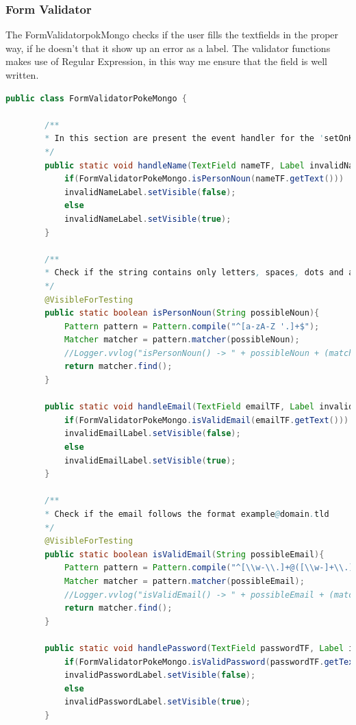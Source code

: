 \subsubsection{Form Validator}
The FormValidatorpokMongo checks if the user fills the textfields in the proper way, if he doesn’t that it show up an error as a label. The validator functions makes use of Regular Expression, in this way me ensure that the field is well written.
\begin{lstlisting}[language=Java]
	public class FormValidatorPokeMongo {
		
		/**
		* In this section are present the event handler for the 'setOnKeyReleased' event in the form.
		*/
		public static void handleName(TextField nameTF, Label invalidNameLabel){
			if(FormValidatorPokeMongo.isPersonNoun(nameTF.getText()))
			invalidNameLabel.setVisible(false);
			else
			invalidNameLabel.setVisible(true);
		}
		
		/**
		* Check if the string contains only letters, spaces, dots and apostrophes.
		*/
		@VisibleForTesting
		public static boolean isPersonNoun(String possibleNoun){
			Pattern pattern = Pattern.compile("^[a-zA-Z '.]+$");
			Matcher matcher = pattern.matcher(possibleNoun);
			//Logger.vvlog("isPersonNoun() -> " + possibleNoun + (matcher.find() ? "-> V" : "-> X"));
			return matcher.find();
		}
		
		public static void handleEmail(TextField emailTF, Label invalidEmailLabel){
			if(FormValidatorPokeMongo.isValidEmail(emailTF.getText()))
			invalidEmailLabel.setVisible(false);
			else
			invalidEmailLabel.setVisible(true);
		}
		
		/**
		* Check if the email follows the format example@domain.tld
		*/
		@VisibleForTesting
		public static boolean isValidEmail(String possibleEmail){
			Pattern pattern = Pattern.compile("^[\\w-\\.]+@([\\w-]+\\.)+[\\w-]{2,4}$");
			Matcher matcher = pattern.matcher(possibleEmail);
			//Logger.vvlog("isValidEmail() -> " + possibleEmail + (matcher.find() ? "-> V" : "-> X"));
			return matcher.find();
		}
		
		public static void handlePassword(TextField passwordTF, Label invalidPasswordLabel){
			if(FormValidatorPokeMongo.isValidPassword(passwordTF.getText()))
			invalidPasswordLabel.setVisible(false);
			else
			invalidPasswordLabel.setVisible(true);
		}
		

\end{lstlisting}
